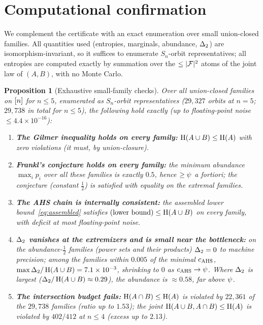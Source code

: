 \documentclass[11pt]{amsart}
\newtheorem{proposition}[theorem]{Proposition}
\theoremstyle{definition}
\theoremstyle{remark}
\begin{document}
\section{Computational confirmation}
\label{sec:computational}

We complement the certificate with an exact enumeration over small union-closed
families. All quantities used (entropies, marginals, abundance, $\Delta_2$) are
isomorphism-invariant, so it suffices to enumerate $S_n$-orbit representatives;
all entropies are computed exactly by summation over the $\le|\mathcal{F}|^2$ atoms of the
joint law of $(A,B)$, with no Monte Carlo.

\begin{proposition}[Exhaustive small-family checks]\label{prop:enum}
Over all union-closed families on $[n]$ for $n\le 5$, enumerated as
$S_n$-orbit representatives ($29{,}327$ orbits at $n=5$; $29{,}738$ in total for
$n\le 5$),
the following hold exactly (up to floating-point noise $\le 4.4\times 10^{-16}$):
\begin{enumerate}[label=\textup{(\arabic*)},leftmargin=2.2em]
\item \textbf{The Gilmer inequality holds on every family:}
$\operatorname{H}(A\cup B)\le\operatorname{H}(A)$ with zero violations (it must, by union-closure).
\item \textbf{Frankl's conjecture holds on every family:} the minimum abundance
$\max_i p_i$ over all these families is exactly $0.5$, hence $\ge\psi$ a fortiori;
the conjecture (constant $\tfrac12$) is satisfied with equality on the extremal
families.
\item \textbf{The AHS chain is internally consistent:} the assembled lower
bound~\eqref{eq:assembled} satisfies $(\text{lower bound})\le\operatorname{H}(A\cup B)$ on every
family, with deficit at most floating-point noise.
\item \textbf{$\Delta_2$ vanishes at the extremizers and is small near the
bottleneck:} on the abundance-$\tfrac12$ families (power sets and their products)
$\Delta_2=0$ to machine precision; among the families within $0.005$ of the minimal
$c_{\mathrm{AHS}}$, $\max\Delta_2/\operatorname{H}(A\cup B)=7.1\times10^{-3}$, shrinking to $0$ as
$c_{\mathrm{AHS}}\to\psi$. Where $\Delta_2$ is largest ($\Delta_2/\operatorname{H}(A\cup B)\approx 0.29$), the
abundance is $\approx 0.58$, far above $\psi$.
\item \textbf{The intersection budget fails:} $\operatorname{H}(A\cap B)\le\operatorname{H}(A)$ is violated
by $22{,}361$ of the $29{,}738$ families (ratio up to $1.53$); the joint
$\operatorname{H}(A\cup B,A\cap B)\le\operatorname{H}(A)$ is violated by $402/412$ at $n\le 4$ (excess up to
$2.13$).
\end{enumerate}
\end{proposition}
\end{document}
